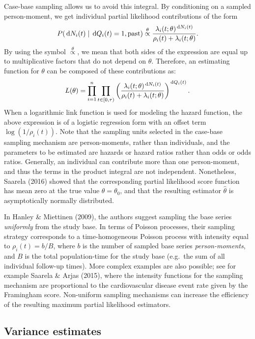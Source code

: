 Case-base sampling allows us to avoid this integral. By conditioning on a sampled person-moment, we get individual partial likelihood contributions of the form
\[P(\,\textrm dN_{i}(t) \mid \,\textrm dQ_{i}(t) = 1,\mathrm{past}) \stackrel{\theta}{\propto} \frac{\lambda_{i}(t; \theta)^{\,\textrm dN_{i}(t)}}{\rho_i(t) + \lambda_{i}(t;\theta)}.\]
By using the symbol \(\stackrel{\theta}{\propto}\), we mean that both sides of the expression are equal up to multiplicative factors that do not depend on \(\theta\). Therefore, an estimating function for \(\theta\) can be composed of these contributions as:
\begin{equation}
L(\theta) = \prod_{i=1}^{n} \prod_{t\in[0,\tau)} \left(\frac{\lambda_{i}(t; \theta)^{\,\textrm dN_{i}(t)}}{\rho_i(t) + \lambda_{i}(t;\theta)}\right)^{\,\textrm dQ_i(t)}. \label{eq:lik-function}
\end{equation}
When a logarithmic link function is used for modeling the hazard function, the above expression is of a logistic regression form with an offset term \(\log(1/\rho_i(t))\). Note that the sampling units selected in the case-base sampling mechanism are person-moments, rather than individuals, and the parameters to be estimated are hazards or hazard ratios rather than odds or odds ratios. Generally, an individual can contribute more than one person-moment, and thus the terms in the product integral are not independent. Nonetheless, Saarela (2016) showed that the corresponding partial likelihood score function has mean zero at the true value \(\theta=\theta_0\), and that the resulting estimator \(\widehat{\theta}\) is asymptotically normally distributed.

In Hanley \& Miettinen (2009), the authors suggest sampling the base series \emph{uniformly} from the study base. In terms of Poisson processes, their sampling strategy corresponds to a time-homogeneous Poisson process with intensity equal to \(\rho_i(t) = b/B\), where \(b\) is the number of sampled base series \emph{person-moments}, and \(B\) is the total population-time for the study base (e.g.~the sum of all individual follow-up times). More complex examples are also possible; see for example Saarela \& Arjas (2015), where the intensity functions for the sampling mechanism are proportional to the cardiovascular disease event rate given by the Framingham score. Non-uniform sampling mechanisms can increase the efficiency of the resulting maximum partial likelihood estimators.

\hypertarget{variance-estimates}{%
\subsection{Variance estimates}\label{variance-estimates}}

